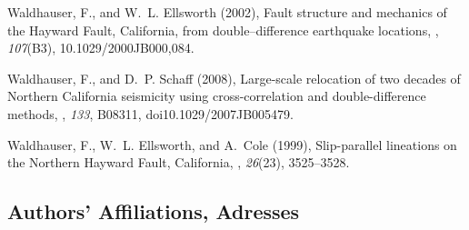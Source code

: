 \documentclass[12pt,double]{article}
\begin{document}
\begin{thebibliography}{45}
Waldhauser, F., and W.~L. Ellsworth (2002), Fault structure and mechanics of
  the {H}ayward {F}ault, {C}alifornia, from double--difference earthquake
  locations, \jgr, \textit{107}(B3),
  10.1029/2000JB000,084.

Waldhauser, F., and D.~P. Schaff (2008), Large-scale relocation of two decades
  of {N}orthern {C}alifornia seismicity using cross-correlation and
  double-difference methods, \jgr,
  \textit{133}, {B08311, doi10.1029/2007JB005479}.

Waldhauser, F., W.~L. Ellsworth, and A.~Cole (1999), Slip-parallel lineations
  on the {N}orthern {H}ayward {F}ault, {C}alifornia, \grl, \textit{26}(23), 3525--3528.

\end{thebibliography}





\vspace{2em}
\begin{centering}
\section*{Authors' Affiliations, Adresses}
\end{centering}
\end{document}
